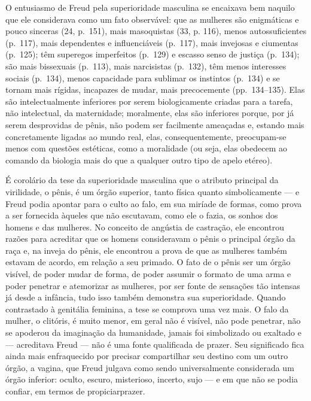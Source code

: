  O entusiasmo de Freud pela superioridade masculina se encaixava bem
naquilo que ele considerava como um fato observável: que as mulheres
são enigmáticas e pouco sinceras (24, p.~151), mais masoquistas (33, p.
116), menos autossuficientes (p.~117), mais dependentes e
influenciáveis (p.~117), mais invejosas e ciumentas (p.~125); têm
superegos imperfeitos (p.~129) e escasso senso de justiça (p.~134); são
mais bissexuais (p.~113), mais narcisistas (p.~132), têm menos
interesses sociais (p.~134), menos capacidade para sublimar os
instintos (p.~134) e se tornam mais rígidas, incapazes de mudar, mais
precocemente (pp.~134--135). Elas são intelectualmente inferiores por
serem biologicamente criadas para a tarefa, não intelectual, da
maternidade; moralmente, elas são inferiores porque, por já serem
desprovidas de pênis, não podem ser facilmente ameaçadas e, estando
mais concretamente ligadas ao mundo real, elas, consequentemente,
preocupam-se menos com questões estéticas, como a moralidade (ou seja,
elas obedecem ao comando da biologia mais do que a qualquer outro tipo
de apelo etéreo).

 É corolário da tese da superioridade masculina que o atributo principal
da virilidade, o pênis, é um órgão superior, tanto física quanto
simbolicamente --- e Freud podia apontar para o culto ao falo, em sua
miríade de formas, como prova a ser fornecida àqueles que não
escutavam, como ele o fazia, os sonhos dos homens e das mulheres. No
conceito de angústia de castração,\idxcasta{} ele encontrou razões para acreditar
que os homens consideravam o pênis o principal órgão da raça e, na
inveja\idxinvej{} do pênis, ele encontrou a prova de que as mulheres também
estavam de acordo, em relação a seu primado. O fato de o pênis ser um
órgão visível, de poder mudar de forma, de poder assumir o formato de
uma arma e poder penetrar e atemorizar as mulheres, por ser fonte de
sensações tão intensas já desde a infância, tudo isso também demonstra
sua superioridade. Quando contrastado à genitália feminina, a tese se
comprova uma vez mais. O falo da mulher, o clitóris,\idxclit{} é muito menor, em
geral não é visível, não pode penetrar, não se apoderou da imaginação
da humanidade, jamais foi simbolizado ou exaltado e --- acreditava Freud
--- não é uma fonte qualificada de prazer. Seu significado fica ainda
mais enfraquecido por precisar compartilhar seu destino com um outro
órgão, a vagina,\idxvagin{} que Freud julgava como sendo universalmente
considerada um órgão inferior: oculto, escuro, misterioso, incerto,
sujo --- e em que não se podia confiar, em termos de propiciar\idxcondfinfe[|)] prazer.

